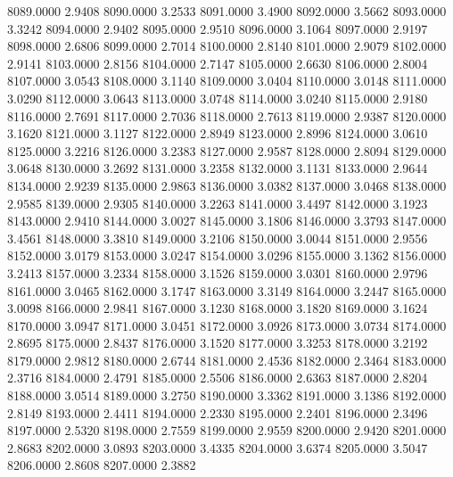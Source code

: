 8089.0000      2.9408
8090.0000      3.2533
8091.0000      3.4900
8092.0000      3.5662
8093.0000      3.3242
8094.0000      2.9402
8095.0000      2.9510
8096.0000      3.1064
8097.0000      2.9197
8098.0000      2.6806
8099.0000      2.7014
8100.0000      2.8140
8101.0000      2.9079
8102.0000      2.9141
8103.0000      2.8156
8104.0000      2.7147
8105.0000      2.6630
8106.0000      2.8004
8107.0000      3.0543
8108.0000      3.1140
8109.0000      3.0404
8110.0000      3.0148
8111.0000      3.0290
8112.0000      3.0643
8113.0000      3.0748
8114.0000      3.0240
8115.0000      2.9180
8116.0000      2.7691
8117.0000      2.7036
8118.0000      2.7613
8119.0000      2.9387
8120.0000      3.1620
8121.0000      3.1127
8122.0000      2.8949
8123.0000      2.8996
8124.0000      3.0610
8125.0000      3.2216
8126.0000      3.2383
8127.0000      2.9587
8128.0000      2.8094
8129.0000      3.0648
8130.0000      3.2692
8131.0000      3.2358
8132.0000      3.1131
8133.0000      2.9644
8134.0000      2.9239
8135.0000      2.9863
8136.0000      3.0382
8137.0000      3.0468
8138.0000      2.9585
8139.0000      2.9305
8140.0000      3.2263
8141.0000      3.4497
8142.0000      3.1923
8143.0000      2.9410
8144.0000      3.0027
8145.0000      3.1806
8146.0000      3.3793
8147.0000      3.4561
8148.0000      3.3810
8149.0000      3.2106
8150.0000      3.0044
8151.0000      2.9556
8152.0000      3.0179
8153.0000      3.0247
8154.0000      3.0296
8155.0000      3.1362
8156.0000      3.2413
8157.0000      3.2334
8158.0000      3.1526
8159.0000      3.0301
8160.0000      2.9796
8161.0000      3.0465
8162.0000      3.1747
8163.0000      3.3149
8164.0000      3.2447
8165.0000      3.0098
8166.0000      2.9841
8167.0000      3.1230
8168.0000      3.1820
8169.0000      3.1624
8170.0000      3.0947
8171.0000      3.0451
8172.0000      3.0926
8173.0000      3.0734
8174.0000      2.8695
8175.0000      2.8437
8176.0000      3.1520
8177.0000      3.3253
8178.0000      3.2192
8179.0000      2.9812
8180.0000      2.6744
8181.0000      2.4536
8182.0000      2.3464
8183.0000      2.3716
8184.0000      2.4791
8185.0000      2.5506
8186.0000      2.6363
8187.0000      2.8204
8188.0000      3.0514
8189.0000      3.2750
8190.0000      3.3362
8191.0000      3.1386
8192.0000      2.8149
8193.0000      2.4411
8194.0000      2.2330
8195.0000      2.2401
8196.0000      2.3496
8197.0000      2.5320
8198.0000      2.7559
8199.0000      2.9559
8200.0000      2.9420
8201.0000      2.8683
8202.0000      3.0893
8203.0000      3.4335
8204.0000      3.6374
8205.0000      3.5047
8206.0000      2.8608
8207.0000      2.3882
